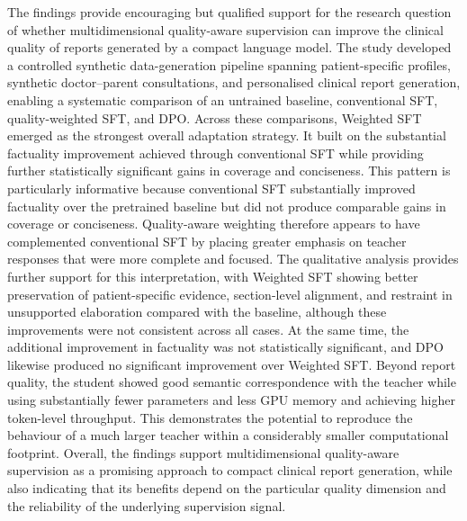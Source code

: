 \documentclass[ %
                    author={Aman Kumar Singh},
                supervisor={Dr. Edwin Simpson},
                    degree={MSc},
                     title={Quality-Aware Knowledge Distillation of Large Language Models for Efficient Personalised Clinical Report Generation},
                  subtitle={},
                      type={},
                      year={2021}]{dissertation}
\begin{document}
The findings provide encouraging but qualified support for the research
question of whether multidimensional quality-aware supervision can improve
the clinical quality of reports generated by a compact language model.
The study developed a controlled synthetic data-generation pipeline spanning
patient-specific profiles, synthetic doctor--parent consultations, and
personalised clinical report generation, enabling a systematic comparison of
an untrained baseline, conventional SFT, quality-weighted SFT, and DPO.
Across these comparisons, Weighted SFT emerged as the strongest overall
adaptation strategy. It built on the substantial factuality improvement
achieved through conventional SFT while providing further statistically
significant gains in coverage and conciseness. This pattern is particularly
informative because conventional SFT substantially improved factuality over
the pretrained baseline but did not produce comparable gains in coverage or
conciseness. Quality-aware weighting therefore appears to have complemented
conventional SFT by placing greater emphasis on teacher responses that were
more complete and focused. The qualitative analysis provides further support
for this interpretation, with Weighted SFT showing better preservation of
patient-specific evidence, section-level alignment, and restraint in
unsupported elaboration compared with the baseline, although these
improvements were not consistent across all cases. At the same time, the
additional improvement in factuality was not statistically significant, and
DPO likewise produced no significant improvement over Weighted SFT.
Beyond report quality, the student showed good semantic correspondence with
the teacher while using substantially fewer parameters and less GPU memory
and achieving higher token-level throughput. This demonstrates the potential
to reproduce the behaviour of a much larger teacher within a considerably
smaller computational footprint. Overall, the findings support
multidimensional quality-aware supervision as a promising approach to compact
clinical report generation, while also indicating that its benefits depend
on the particular quality dimension and the reliability of the underlying
supervision signal.
\end{document}
